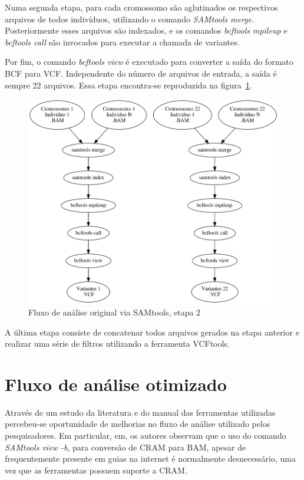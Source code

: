 \documentclass[cic,tc]{iiufrgs}
\begin{document}
Numa segunda etapa, para cada cromossomo são aglutinados os respectivos
arquivos de todos indivíduos, utilizando o comando \textit{SAMtools merge}.
Posteriormente esses arquivos são indexados, e os comandos \textit{bcftools
mpileup} e \textit{bcftools call} são invocados para executar a chamada de
variantes.

Por fim, o comando \textit{bcftools view} é executado para converter a saída do
formato BCF para VCF. Independente do número de arquivos de entrada, a saída é
sempre 22 arquivos. Essa etapa encontra-se reproduzida na
figura~\ref{fig:stage2_orig}.

\begin{figure}
  \caption{Fluxo de análise original via SAMtools, etapa 2}
    \begin{center}
      \includegraphics[width=0.85\linewidth]{img/stage2_orig.png}
    \end{center}
    \label{fig:stage2_orig}
\end{figure}

A última etapa consiste de concatenar todos arquivos gerados na etapa anterior
e realizar uma série de filtros utilizando a ferramenta VCFtools.\cite{10.1093/bioinformatics/btr330}

\section{Fluxo de análise otimizado}

Através de um estudo da literatura e do manual das ferramentas utilizadas
percebeu-se oportunidade de melhorias no fluxo de análise utilizado pelos
pesquisadores. Em particular, em,\cite{danecek2021twelve} os autores observam
que o uso do comando \textit{SAMtools view -b}, para conversão de CRAM para
BAM, apesar de frequentemente presente em guias na internet é normalmente
desnecessário, uma vez que as ferramentas possuem suporte a CRAM.
\end{document}
